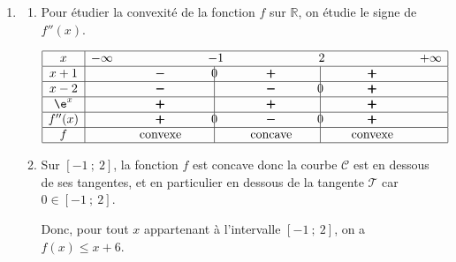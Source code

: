 \begin{enumerate}[resume]
\item 
	\begin{enumerate}
		\item Pour étudier la convexité de la fonction $f$ sur $\mathbb{R}$, on étudie le signe de $f''(x)$.
		
\begin{center}
{
\renewcommand{\arraystretch}{1.5}
\def\esp{\hspace*{2cm}}
$\begin{array}{|c | *{7}{c} |} 
\hline
x  & -\infty & \esp & -1 & \esp & 2 & \esp & +\infty \\
\hline
x+1 &  & \pmb{-} &  \vline\hspace{-2.7pt}{0} & \pmb{+} & \vline\hspace{-2.7pt}{\phantom 0} & \pmb{+} &\\
\hline
x-2 &  & \pmb{-} &  \vline\hspace{-2.7pt}{\phantom 0} & \pmb{-} & \vline\hspace{-2.7pt}{0} & \pmb{+} &\\
\hline
\e^x &  & \pmb{+} &  \vline\hspace{-2.7pt}{\phantom 0} & \pmb{+} & \vline\hspace{-2.7pt}{\phantom 0} & \pmb{+} &\\
\hline
f''(x) &  & \pmb{+} &  \vline\hspace{-2.7pt}{0} & \pmb{-} & \vline\hspace{-2.7pt}{0} & \pmb{+} & \\
\hline
f &  & \text{convexe} &  \vline\hspace{-2.7pt}{\phantom 0} & \text{concave} & \vline\hspace{-2.7pt}{\phantom 0} & \text{convexe} & \\
\hline
\end{array}$
}
\end{center}
		
		\item 
Sur $[-1~;~2]$, la fonction $f$ est concave donc la courbe $\mathcal{C}$ est en dessous de ses tangentes, et en particulier en dessous de la tangente $\mathcal{T}$ car $0\in [-1~;~2]$.		
		
Donc, pour tout $x$ appartenant à l'intervalle $[-1~;~2]$, on a $f(x) \leqslant x + 6$.		
	\end{enumerate}
\end{enumerate}

\bigskip
